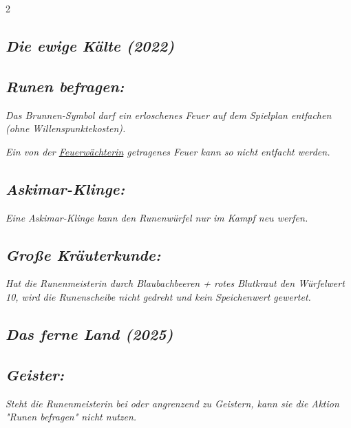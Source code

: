 \documentclass[10pt, a4paper, oneside]{book}
\newcommand{\fan}[1]{\textit{#1}}
\begin{document}
\begin{multicols*}{2}
\begin{bgcolor}[color-DZ]
\end{bgcolor}

\begin{bgcolor}
\section{\fan{Die ewige Kälte (2022)}}

\subsection{\fan{Runen befragen:}}


\fan{Das Brunnen-Symbol darf ein erloschenes Feuer auf dem Spielplan entfachen (ohne Willenspunktekosten).}


\fan{Ein von der \hyperref[Feuerwächterin]{Feuerwächterin} getragenes Feuer kann so nicht entfacht werden.}



\subsection{\fan{Askimar-Klinge:}}

\fan{Eine Askimar-Klinge kann den Runenwürfel nur im Kampf neu werfen.}



\subsection{\fan{Große Kräuterkunde:}}

\fan{Hat die Runenmeisterin durch Blaubachbeeren + rotes Blutkraut den Würfelwert 10, wird die Runenscheibe nicht gedreht und kein Speichenwert gewertet. }

\end{bgcolor}






\begin{bgcolor}
\section{\fan{Das ferne Land (2025)}}



\subsection{\fan{Geister:}}

\fan{Steht die Runenmeisterin bei oder angrenzend zu Geistern, kann sie die Aktion "Runen befragen" nicht nutzen.}


\end{bgcolor}
\end{multicols*}
\end{document}
